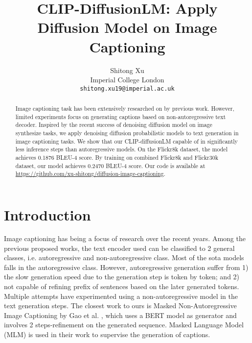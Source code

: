 \documentclass{article}
\title{CLIP-DiffusionLM: Apply Diffusion Model on Image Captioning
}
\author{
  Shitong Xu \\
  Imperial College London \\
  \texttt{shitong.xu19@imperial.ac.uk} \\
}
\begin{document}
\maketitle


\begin{abstract}
Image captioning task has been extensively researched on by previous work. However, limited experiments focus on generating captions based on non-autoregressive text decoder. Inspired by the recent success of denoising diffusion model on image synthesize tasks, we apply denoising diffusion probabilistic models to text generation in image captioning tasks. We show that our CLIP-diffusionLM capable of in significantly less inference steps than autoregressive models. On the Flickr8k dataset, the model achieves 0.1876 BLEU-4 score. By training on combined Flickr8k and Flickr30k dataset, our model achieves 0.2470 BLEU-4 score. Our code is available at \href{https://github.com/xu-shitong/diffusion-image-captioning}{https://github.com/xu-shitong/diffusion-image-captioning}.

\end{abstract}


\section{Introduction}
Image captioning has being a focus of research over the recent years. Among the previous proposed works, the text encoder used can be classified to 2 general classes, i.e. autoregressive and non-autoregressive class. Most of the sota models falls in the autoregressive class\cite{https://doi.org/10.48550/arxiv.1412.6632,DBLP:journals/corr/XuBKCCSZB15,DBLP:journals/corr/LuXPS16,image-caption-with-pos,mplug}. However, autoregressive generation suffer from 1) the slow generation speed due to the generation step is token by token; and 2) not capable of refining prefix of sentences based on the later generated tokens. Multiple attempts have experimented using a non-autoregressive model in the text generation steps\cite{masked-non-autoregres, partial-autoregressive, semi-autoregressive}. The closest work to ours is Masked Non-Autoregressive Image Captioning by Gao et al. \cite{masked-non-autoregres}, which uses a BERT model as generator and involves 2 steps-refinement on the generated sequence. Masked Language Model (MLM) is used in their work to supervise the generation of captions.
\end{document}

